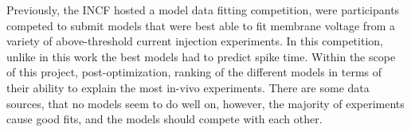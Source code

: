 Previously, the INCF hosted a model data fitting competition, were participants competed to submit models that were best able to fit membrane voltage from a variety of above-threshold current injection experiments. In this competition, unlike in this work the best models had to predict spike time. Within the scope of this project, post-optimization, ranking of the different models in terms of their ability to explain the most in-vivo experiments.  There are some data sources, that no models seem to do well on, however, the majority of experiments cause good fits, and the models should compete with each other.